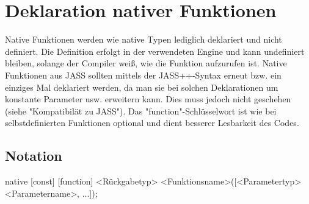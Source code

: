 \chapter { Deklaration nativer Funktionen }

Native Funktionen werden wie native Typen lediglich deklariert und nicht definiert. Die Definition erfolgt in der verwendeten Engine und kann
undefiniert bleiben, solange der Compiler weiß, wie die Funktion aufzurufen ist.
Native Funktionen aus JASS sollten mittels der JASS++-Syntax erneut bzw. ein einziges Mal deklariert werden, da man sie bei solchen Deklarationen
um konstante Parameter usw. erweitern kann.
Dies muss jedoch nicht geschehen (siehe "Kompatibilät zu JASS").
Das "function"-Schlüsselwort ist wie bei selbstdefinierten Funktionen optional und dient besserer Lesbarkeit des Codes. 

\section { Notation }
native [const] [function] <Rückgabetyp> <Funktionsname>([<Parametertyp> <Parametername>, ...]);